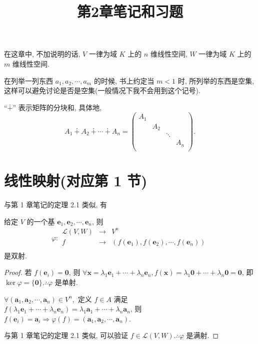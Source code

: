 \documentclass[color=black,device=normal,lang=cn,mode=geye]{elegantnote}
\title{第2章笔记和习题}
\begin{document}
\maketitle
在这章中, 不加说明的话, $V$ 一律为域 $K$ 上的 $n$ 维线性空间, $W$ 一律为域 $K$ 上的 $m$ 维线性空间.

在列举一列东西 $a_1,a_2,\cdots,a_m$ 的时候, 书上约定当 $m<1$ 时, 所列举的东西是空集, 这样可以避免讨论是否是空集(一般情况下我不会用到这个记号).

``$\dotplus$'' 表示矩阵的分块和, 具体地,
\[A_1\dotplus A_2\dotplus\cdots\dotplus A_n=\begin{pmatrix}
    A_1 \\
    & A_2 \\
    && \ddots \\
    &&& A_n \\
\end{pmatrix}.\]
\section{线性映射(对应第 1 节)}
与第 1 章笔记的定理 2.1 类似, 有
\begin{theorem}\label{t1.1}
    给定 $V$ 的一个基 $\boldsymbol{e}_1,\boldsymbol{e}_2,\cdots,\boldsymbol{e}_n$, 则
    \[\varphi:\begin{array}{rcl}
        \mathcal{L}(V,W) & \to & V^n \\
        f & \to & (f(\boldsymbol{e}_1),f(\boldsymbol{e}_2),\cdots,f(\boldsymbol{e}_n)) \\
    \end{array}\]
    是双射.
\end{theorem}
\begin{proof}
    若 $f(\boldsymbol{e}_i)=\boldsymbol{0}$, 则 $\forall\boldsymbol{x}=\lambda_1\boldsymbol{e}_1+\cdots+\lambda_n\boldsymbol{e}_n,f(\boldsymbol{x})=\lambda_1\boldsymbol{0}+\cdots+\lambda_n\boldsymbol{0}=\boldsymbol{0}$, 即 $\ker\varphi=\{\boldsymbol{0}\}.\therefore\varphi$ 是单射.

    $\forall(\boldsymbol{a}_1,\boldsymbol{a}_2,\cdots,\boldsymbol{a}_n)\in V^n,$ 定义 $f\in A$ 满足 $f(\lambda_1\boldsymbol{e}_1+\cdots+\lambda_n\boldsymbol{e}_n)=\lambda_1\boldsymbol{a}_1+\cdots+\lambda_n\boldsymbol{a}_n$, 则 $f(\boldsymbol{e}_i)=\boldsymbol{a}_i\Rightarrow\varphi(f)=(\boldsymbol{a}_1,\boldsymbol{a}_2,\cdots,\boldsymbol{a}_n)$.

    与第 1 章笔记的定理 2.1 类似, 可以验证 $f\in\mathcal{L}(V,W).\therefore\varphi$ 是满射.
\end{proof}
\end{document}
